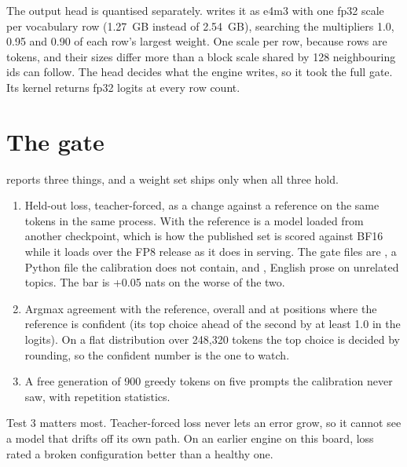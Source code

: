 The output head is quantised separately.  writes it as e4m3 with one fp32 scale per vocabulary row (1.27~GB instead of 2.54~GB), searching the multipliers 1.0, 0.95 and 0.90 of each row's largest weight. One scale per row, because rows are tokens, and their sizes differ more than a block scale shared by 128 neighbouring ids can follow. The head decides what the engine writes, so it took the full gate. Its kernel returns fp32 logits at every row count.

\section{The gate}\label{sec:quality-gate}

 reports three things, and a weight set ships only when all three hold.

\begin{enumerate}
\item Held-out loss, teacher-forced, as a change against a reference on the same tokens in the same process. With  the reference is a model loaded from another checkpoint, which is how the published set is scored against BF16 while it loads over the FP8 release as it does in serving. The gate files are , a Python file the calibration does not contain, and , English prose on unrelated topics. The bar is +0.05 nats on the worse of the two.
\item Argmax agreement with the reference, overall and at positions where the reference is confident (its top choice ahead of the second by at least 1.0 in the logits). On a flat distribution over 248,320 tokens the top choice is decided by rounding, so the confident number is the one to watch.
\item A free generation of 900 greedy tokens on five prompts the calibration never saw, with repetition statistics.
\end{enumerate}

Test 3 matters most. Teacher-forced loss never lets an error grow, so it cannot see a model that drifts off its own path. On an earlier engine on this board, loss rated a broken configuration better than a healthy one.

